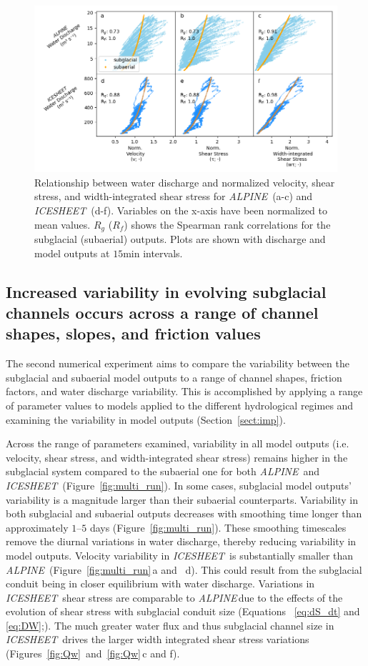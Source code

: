 \documentclass[tc, manuscript]{copernicus}
\newcommand{\alpine}{\textit{ALPINE}\,}
\newcommand{\icesheet}{\textit{ICESHEET}\,}
\begin{document}
\begin{figure}[hbt!]
  \centering
  \includegraphics[width=0.8\linewidth]{Fig6.png}
  \caption{
    Relationship between water discharge and normalized velocity, shear stress, and width-integrated shear stress for \alpine{} (a-c) and \icesheet{} (d-f).
    Variables on the x-axis have been normalized to mean values.
    $R_g$ ($R_f$) shows the Spearman rank correlations for the subglacial (subaerial) outputs.
    Plots are shown with discharge and model outputs at $15$\unit{min} intervals.
  }
  \label{fig:Qw_vari}
\end{figure}


\FloatBarrier
\subsection{Increased variability in evolving subglacial channels occurs across a range of channel shapes, slopes,  and friction values}
\label{sect:ensemble}

The second numerical experiment aims to compare the variability between the subglacial and subaerial model outputs to a range of channel shapes, friction factors, and water discharge variability. 
This is accomplished by applying a range of parameter values to models applied to the different hydrological regimes and examining the variability in model outputs (Section~\ref{sect:imp}).

Across the range of parameters examined, variability in all model outputs (i.e. velocity, shear stress, and width-integrated shear stress) remains higher in the subglacial system compared to the subaerial one for both \alpine{} and \icesheet{} (Figure~\ref{fig:multi_run}).
In some cases, subglacial model outputs' variability is a magnitude larger than their subaerial counterparts.
Variability in both subglacial and subaerial outputs decreases with smoothing time longer than approximately $1$--$5$ days (Figure~\ref{fig:multi_run}).
These smoothing timescales remove the diurnal variations in water discharge, thereby reducing variability in model outputs. 
Velocity variability in \icesheet{} is substantially smaller than \alpine{} (Figure~\ref{fig:multi_run}\,a and \, d).
This could result from the subglacial conduit being in closer equilibrium with water discharge.
Variations in \icesheet{} shear stress are comparable to \alpine due to the effects of the evolution of shear stress with subglacial conduit size (Equations ~\ref{eq:dS_dt} and \ref{eq:DW};). 
The much greater water flux and thus subglacial channel size in \icesheet{} drives the larger width integrated shear stress variations (Figures~\ref{fig:Qw}~and~\ref{fig:Qw}\,c and f).
\end{document}
